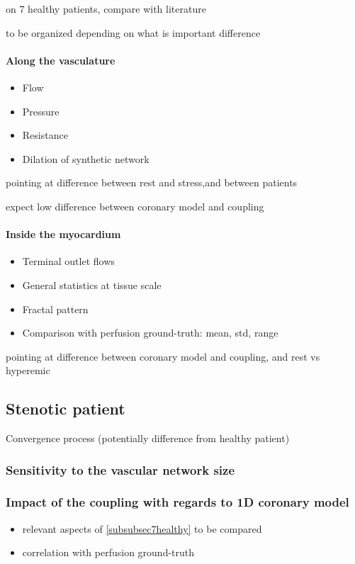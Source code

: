 \documentclass[journal]{IEEEtran}
\begin{document}
on 7 healthy patients, compare with literature

to be organized depending on what is important difference
\paragraph{Along the vasculature}
\begin{itemize}
\item Flow
\item Pressure
\item Resistance
\item Dilation of synthetic network
\end{itemize}
pointing at difference between rest and stress,and between patients

expect low difference between coronary model and coupling
\paragraph{Inside the myocardium}
\begin{itemize}
\item Terminal outlet flows
\item General statistics at tissue scale
\item Fractal pattern
\item Comparison with perfusion ground-truth: mean, std, range
\end{itemize}
pointing at difference between coronary model and coupling, and rest vs hyperemic
\subsection{Stenotic patient}
Convergence process (potentially difference from healthy patient)
\subsubsection{Sensitivity to the vascular network size}
\subsubsection{Impact of the coupling with regards to 1D coronary model}
\begin{itemize}
\item relevant aspects of \ref{subsubsec7healthy} to be compared
\item correlation with perfusion ground-truth
\end{itemize}
\end{document}
